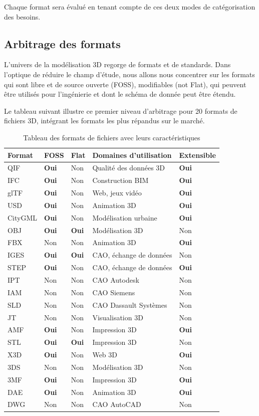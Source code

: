 \documentclass[a4paper,12pt]{article}
\begin{document}
Chaque format sera évalué en tenant compte de ces deux modes de catégorisation des besoins.
\subsection*{Arbitrage des formats}
\label{sec:orga0e56da}
L'univers de la modélisation 3D regorge de formats et de standards. Dans l'optique de réduire le champ d'étude, nous allons nous concentrer sur les formats qui sont libre et de source ouverte (FOSS), modifiables (not Flat), qui peuvent être utilisés pour l'ingénierie et dont le schéma de donnée peut être étendu.

Le tableau suivant illustre ce premier niveau d'arbitrage pour 20 formats de fichiers 3D, intégrant les formats les plus répandus sur le marché.

\begin{table}[htbp]
\caption{Tableau des formats de fichiers avec leurs caractéristiques}
\centering
\begin{tabular}{lllll}
Format & FOSS & Flat & Domaines d'utilisation & Extensible\\
\hline
QIF & \textbf{Oui} & Non & Qualité des données 3D & \textbf{Oui}\\
IFC & \textbf{Oui} & Non & Construction BIM & \textbf{Oui}\\
glTF & \textbf{Oui} & Non & Web, jeux vidéo & \textbf{Oui}\\
USD & \textbf{Oui} & Non & Animation 3D & \textbf{Oui}\\
CityGML & \textbf{Oui} & Non & Modélisation urbaine & \textbf{Oui}\\
OBJ & \textbf{Oui} & \textbf{Oui} & Modélisation 3D & Non\\
FBX & Non & Non & Animation 3D & \textbf{Oui}\\
IGES & \textbf{Oui} & \textbf{Oui} & CAO, échange de données & Non\\
STEP & \textbf{Oui} & Non & CAO, échange de données & \textbf{Oui}\\
IPT & Non & Non & CAO Autodesk & Non\\
IAM & Non & Non & CAO Siemens & Non\\
SLD & Non & Non & CAO Dassault Systèmes & Non\\
JT & Non & Non & Visualisation 3D & Non\\
AMF & \textbf{Oui} & Non & Impression 3D & \textbf{Oui}\\
STL & \textbf{Oui} & \textbf{Oui} & Impression 3D & Non\\
X3D & \textbf{Oui} & Non & Web 3D & \textbf{Oui}\\
3DS & Non & Non & Modélisation 3D & Non\\
3MF & \textbf{Oui} & Non & Impression 3D & \textbf{Oui}\\
DAE & \textbf{Oui} & Non & Animation 3D & \textbf{Oui}\\
DWG & Non & Non & CAO AutoCAD & Non\\
\end{tabular}
\end{table}
\end{document}

